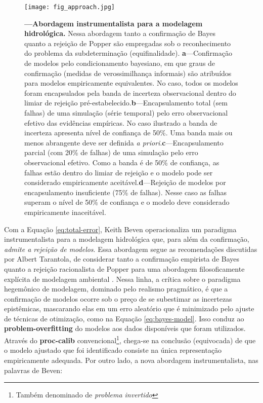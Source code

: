 \documentclass[./main.tex]{subfiles}
\begin{document}
\begin{figure}[t!] %
	\centering				
	\texttt{[image: fig\_approach.jpg]}		
	\caption[Abordagem instrumentalista para a modelagem hidrológica]
	{\textbf{---\;Abordagem instrumentalista para a modelagem hidrológica.}
        Nessa abordagem tanto a confirmação de Bayes quanto a rejeição de Popper são empregadas sob o reconhecimento do problema da subdeterminação (equifinalidade). \;\textbf{a}\;---\;Confirmação de modelos pelo condicionamento bayesiano, em que graus de confirmação (medidas de verossimilhança informais) são atribuídos para modelos empiricamente equivalentes. No caso, todos os modelos foram encapsulados pela banda de incerteza observacional dentro do limiar de rejeição pré-estabelecido.\;\textbf{b}\;---\;Encapsulamento total (sem falhas) de uma simulação (série temporal) pelo erro observacional efetivo das evidências empíricas. No caso ilustrado a banda de incerteza apresenta nível de confiança de 50\%. Uma banda mais ou menos abrangente deve ser definida \textit{a priori}.\;\textbf{c}\;---\;Encapsulamento parcial (com 20\% de falhas) de uma simulação pelo erro observacional efetivo. Como a banda é de 50\% de confiança, as falhas estão dentro do limiar de rejeição e o modelo pode ser considerado empiricamente aceitável.\;\textbf{d}\;---\;Rejeição de modelos por encapsulamento insuficiente (75\% de falhas). Nesse caso as falhas superam o nível de 50\% de confiança e o modelo deve considerado empiricamente inaceitável.\;
	}
\label{fig:approach}  %
\end{figure}

\par Com a Equação \eqref{eq:total-error}, Keith Beven operacionaliza um \gls{paradigma} instrumentalista para a modelagem hidrológica que, para além da confirmação, \textit{admite a rejeição de modelos}. Essa abordagem segue as recomendações discutidas por Albert Tarantola, de considerar tanto a confirmação empirista de Bayes quanto a rejeição racionalista de Popper para uma abordagem filosoficamente explícita de modelagem ambiental \cite{Tarantola2006}. Nessa linha, a crítica sobre o \gls{paradigma} hegemônico de modelagem, dominado pelo realismo pragmático, é que a confirmação de modelos ocorre sob o preço de se subestimar as incertezas epistêmicas, mascarando elas em um erro aleatório que é minimizado pelo ajuste de técnicas de otimização, como na Equação \eqref{eq:bayes-model}. Isso conduz ao \textbf{\gls{problem-overfitting}} do modelos aos dados disponíveis que foram utilizados. Através do \textbf{\gls{proc-calib}} convencional\footnote{Também denominado de \textit{problema invertido}}, chega-se na conclusão (equivocada) de que o modelo ajustado que foi identificado consiste na única representação empiricamente adequada. Por outro lado, a nova abordagem instrumentalista, nas palavras de Beven:
\end{document}
